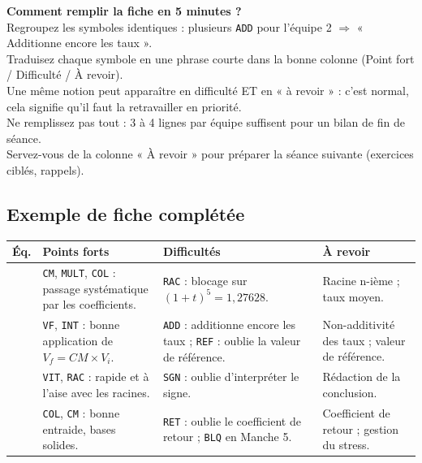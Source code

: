 \documentclass[12pt,a4paper]{article}
\begin{document}
\begin{conseil}
	\textbf{Comment remplir la fiche en 5 minutes ?}\\[0.2cm]
	\textbullet{} Regroupez les symboles identiques : plusieurs \texttt{ADD} pour l'équipe 2 \(\Rightarrow\) « Additionne encore les taux ».\\[0.2cm]
	\textbullet{} Traduisez chaque symbole en une phrase courte dans la bonne colonne (Point fort / Difficulté / À revoir).\\[0.2cm]
	\textbullet{} Une même notion peut apparaître en difficulté ET en « à revoir » : c'est normal, cela signifie qu'il faut la retravailler en priorité.\\[0.2cm]
	\textbullet{} Ne remplissez pas tout : 3 à 4 lignes par équipe suffisent pour un bilan de fin de séance.\\[0.2cm]
	\textbullet{} Servez-vous de la colonne « À revoir » pour préparer la séance suivante (exercices ciblés, rappels).
\end{conseil}

\vspace{0.4cm}

\subsection*{Exemple de fiche complétée}

\begin{center}
	\renewcommand{\arraystretch}{1.6}
	\begin{tabular}{|>{\centering\arraybackslash}p{1.2cm}|>{\raggedright\arraybackslash}p{4.4cm}|>{\raggedright\arraybackslash}p{4.4cm}|>{\raggedright\arraybackslash}p{4.4cm}|}
		\hline
		\textbf{Éq.} & \textbf{Points forts} & \textbf{Difficultés} & \textbf{À revoir} \\
		\hline
		1 & \texttt{CM}, \texttt{MULT}, \texttt{COL} : passage systématique par les coefficients. & \texttt{RAC} : blocage sur \((1+t)^5 = 1{,}27628\). & Racine n-ième ; taux moyen. \\
		\hline
		2 & \texttt{VF}, \texttt{INT} : bonne application de \(V_f = CM \times V_i\). & \texttt{ADD} : additionne encore les taux ; \texttt{REF} : oublie la valeur de référence. & Non-additivité des taux ; valeur de référence. \\
		\hline
		3 & \texttt{VIT}, \texttt{RAC} : rapide et à l'aise avec les racines. & \texttt{SGN} : oublie d'interpréter le signe. & Rédaction de la conclusion. \\
		\hline
		4 & \texttt{COL}, \texttt{CM} : bonne entraide, bases solides. & \texttt{RET} : oublie le coefficient de retour ; \texttt{BLQ} en Manche 5. & Coefficient de retour ; gestion du stress. \\
		\hline
	\end{tabular}
\end{center}
\end{document}
